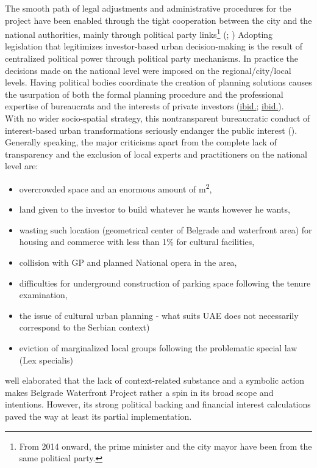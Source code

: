 \documentclass[11pt]{report}
\begin{document}
\begin{itemize}
The smooth path of legal adjustments and administrative procedures for the project have been enabled through the tight cooperation between the city and the national authorities, mainly through political party links\footnote{From 2014 onward, the prime minister and the city mayor have been from the same political party.}
(\href{Maruna}{\citealt{maruna_can_2015}}; \href{Peric}{\citealt{peric_evolution_2016}})
Adopting legislation that legitimizes investor-based urban decision-making is the result of centralized political power through political party mechanisms. In practice the decisions made on the national level were imposed on the regional/city/local levels. Having political bodies coordinate the creation of planning solutions causes the usurpation of both the formal planning procedure and the professional expertise of bureaucrats and the interests of private investors (\href{Maruna}{ibid.}; \href{Peric}{ibid.}).
\\

With no wider socio-spatial strategy, this nontransparent bureaucratic conduct of interest-based urban transformations seriously endanger the public interest (\href{Vukmirovic}{\citealt{doytchinov_belgrade:_2015}}). 
Generally speaking, the major criticisms apart from the complete lack of transparency and the exclusion of local experts and practitioners on the national level are:

\begin{itemize}
\item overcrowded space and an enormous amount of m\textsuperscript{2},
\item land given to the investor to build whatever he wants however he wants,
\item wasting such location (geometrical center of Belgrade and waterfront area) for housing and commerce with less than 1\% for cultural facilities,
\item collision with GP and planned National opera in the area,
\item difficulties for underground construction of parking space following the tenure examination,
\item the issue of cultural urban planning - what suits UAE does not necessarily correspond to the Serbian context)
\item eviction of marginalized local groups following the problematic special law (Lex specialis)
\end{itemize}

\href{Vukmirovic}{\cite{doytchinov_belgrade:_2015}}
well elaborated that the lack of context-related substance and a symbolic action makes Belgrade Waterfront Project rather a spin in its broad scope and intentions. However, its strong political backing and financial interest calculations paved the way at least its partial implementation.
\end{itemize}
\end{document}
